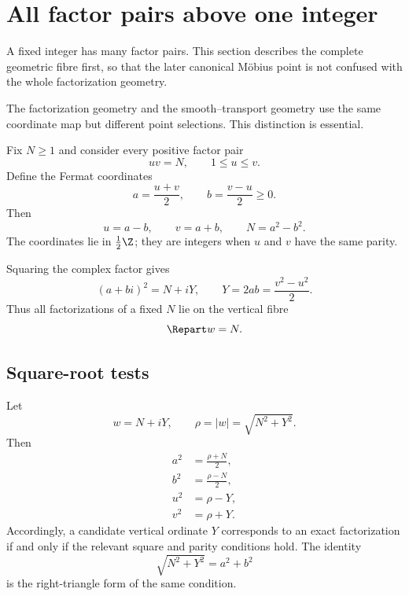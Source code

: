 \section{All factor pairs above one integer}
\label{sec:full-fibre}

A fixed integer has many factor pairs.  This section describes the complete geometric fibre first, so that the later canonical M\"obius point is not confused with the whole factorization geometry.

The factorization geometry and the smooth--transport geometry use the same coordinate map but different point selections.  This distinction is essential.

Fix $N\ge1$ and consider every positive factor pair
\begin{equation}
 uv=N,
 \qquad
 1\le u\le v.
 \label{eq:factor-pair}
\end{equation}
Define the Fermat coordinates
\begin{equation}
 a=\frac{u+v}{2},
 \qquad
 b=\frac{v-u}{2}\ge0.
 \label{eq:full-Fermat}
\end{equation}
Then
\begin{equation}
 u=a-b,
 \qquad
 v=a+b,
 \qquad
 N=a^2-b^2.
 \label{eq:full-recovery}
\end{equation}
The coordinates lie in $\frac12\Z$; they are integers when $u$ and $v$ have the same parity.

Squaring the complex factor gives
\begin{equation}
 (a+bi)^2=N+iY,
 \qquad
 \boxed{Y=2ab=\frac{v^2-u^2}{2}.}
 \label{eq:full-square}
\end{equation}
Thus all factorizations of a fixed $N$ lie on the vertical fibre
\begin{equation}
 \Repart w=N.
 \label{eq:vertical-fibre}
\end{equation}

\subsection{Square-root tests}

Let
\begin{equation}
 w=N+iY,
 \qquad
 \rho=|w|=\sqrt{N^2+Y^2}.
 \label{eq:rho-full}
\end{equation}
Then
\begin{align}
 a^2&=\frac{\rho+N}{2},
 \label{eq:a-square}\\
 b^2&=\frac{\rho-N}{2},
 \label{eq:b-square}\\
 u^2&=\rho-Y,
 \label{eq:u-square}\\
 v^2&=\rho+Y.
 \label{eq:v-square}
\end{align}
Accordingly, a candidate vertical ordinate $Y$ corresponds to an exact factorization if and only if the relevant square and parity conditions hold.  The identity
\begin{equation}
 \sqrt{N^2+Y^2}=a^2+b^2
 \label{eq:hypotenuse}
\end{equation}
is the right-triangle form of the same condition.

